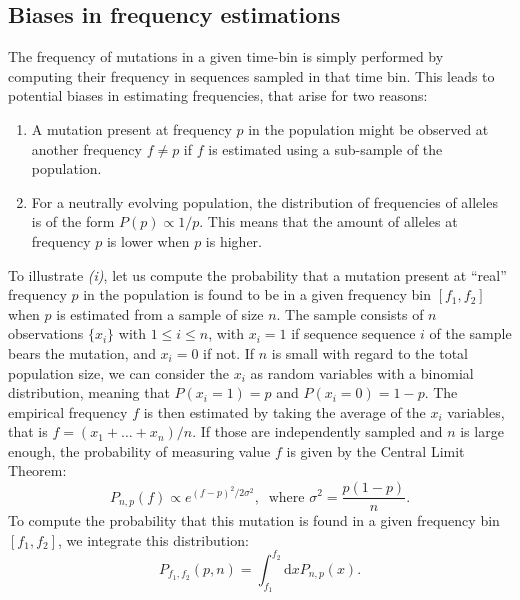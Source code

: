 \documentclass[reprint,amsmath,amssymb,superscriptaddress,showpacs,rmp]{revtex4-1}
\providecommand{\DIFaddend}{} %
\DeclareRobustCommand{\DIFaddend}{\DIFOaddend \let\includegraphics\DIFOincludegraphics} %
\begin{document}
\DIFaddend 


\subsection{Biases in frequency estimations} %
\label{sub:biases_in_frequency_estimations}

	The frequency of mutations in a given time-bin is simply performed by computing their frequency in sequences sampled in that time bin. 
	This leads to potential biases in estimating frequencies, that arise for two reasons:
	\begin{enumerate}[label=(\roman*)]
		\item A mutation present at frequency $p$ in the population might be observed at another frequency $f\neq p$ if $f$ is estimated using a sub-sample of the population. 
		\item For a neutrally evolving population, the distribution of frequencies of alleles is of the form $P(p)\propto 1/p$. This means that the amount of alleles at frequency $p$ is lower when $p$ is higher. 
	\end{enumerate}
	To illustrate \emph{(i)}, let us compute the probability that a mutation present at ``real'' frequency $p$ in the population is found to be in a given frequency bin $[f_1,f_2]$ when $p$ is estimated from a sample of size $n$. 
	The sample consists of $n$ observations $\{x_i\}$ with $1\leq i\leq n$, with $x_i=1$ if sequence sequence $i$ of the sample bears the mutation, and $x_i=0$ if not. 
	If $n$ is small with regard to the total population size, we can consider the $x_i$ as random variables with a binomial distribution, meaning that $P(x_i=1)=p$ and $P(x_i=0) = 1-p$.  
	The empirical frequency $f$ is then estimated by taking the average of the $x_i$ variables, that is $f = (x_1 + \ldots + x_n)/n$. 
	If those are independently sampled and $n$ is large enough, the probability of measuring value $f$ is given by the Central Limit Theorem:
	\begin{equation}
		P_{n,p}(f) \propto e^{(f - p)^2 / 2\sigma^2},\;\; \text{where } \sigma^2 = \frac{p(1-p)}{n}.
		\label{eq:ctl}
	\end{equation}
	To compute the probability that this mutation is found in a given frequency bin $[f_1,f_2]$, we integrate this distribution: 
	\begin{equation}
		P_{f_1,f_2}(p,n) = \int_{f_1}^{f_2}\text{d}x P_{n,p}(x). %
		\label{eq:pinterval}
	\end{equation}
\end{document}

